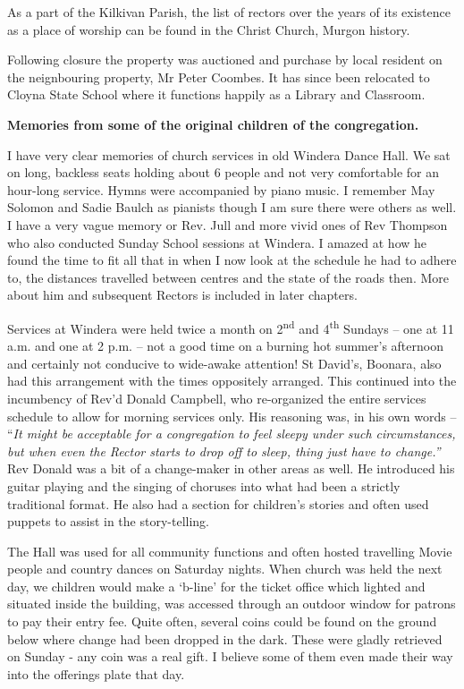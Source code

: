 As a part of the Kilkivan Parish, the list of rectors over the years of
its existence as a place of worship can be found in the Christ Church,
Murgon history.

Following closure the property was auctioned and purchase by local
resident on the neignbouring property, Mr Peter Coombes. It has since
been relocated to Cloyna State School where it functions happily as a
Library and Classroom.

\textbf{Memories from some of the original children of the
congregation.}

I have very clear memories of church services in old Windera Dance Hall.
We sat on long, backless seats holding about 6 people and not very
comfortable for an hour-long service. Hymns were accompanied by piano
music. I remember May Solomon and Sadie Baulch as pianists though I am
sure there were others as well. I have a very vague memory or Rev. Jull
and more vivid ones of Rev Thompson who also conducted Sunday School
sessions at Windera. I amazed at how he found the time to fit all that
in when I now look at the schedule he had to adhere to, the distances
travelled between centres and the state of the roads then. More about
him and subsequent Rectors is included in later chapters.

Services at Windera were held twice a month on 2\textsuperscript{nd} and
4\textsuperscript{th} Sundays -- one at 11 a.m. and one at 2 p.m. -- not
a good time on a burning hot summer's afternoon and certainly not
conducive to wide-awake attention! St David's, Boonara, also had this
arrangement with the times oppositely arranged. This continued into the
incumbency of Rev'd Donald Campbell, who re-organized the entire
services schedule to allow for morning services only. His reasoning was,
in his own words -- ``\emph{It might be acceptable for a congregation to
feel sleepy under such circumstances, but when even the Rector starts to
drop off to sleep, thing just have to change.''} Rev Donald was a bit of
a change-maker in other areas as well. He introduced his guitar playing
and the singing of choruses into what had been a strictly traditional
format. He also had a section for children's stories and often used
puppets to assist in the story-telling.

The Hall was used for all community functions and often hosted
travelling Movie people and country dances on Saturday nights. When
church was held the next day, we children would make a `b-line' for the
ticket office which lighted and situated inside the building, was
accessed through an outdoor window for patrons to pay their entry fee.
Quite often, several coins could be found on the ground below where
change had been dropped in the dark. These were gladly retrieved on
Sunday - any coin was a real gift. I believe some of them even made
their way into the offerings plate that day.

